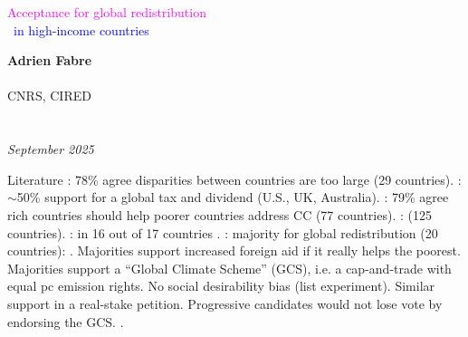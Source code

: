 \documentclass[aspectratio=169,xcolor=dvipsnames, 11pt,mathserif]{beamer}
\begin{document}

\begin{frame}
\thispagestyle{empty}
\begin{center}
\begin{LARGE}
\textcolor{magenta}{Acceptance for global redistribution}\\~\textcolor{blue}{in high-income countries} \end{LARGE}
\vspace{1cm}

\textbf{Adrien Fabre} \\ \quad \\
CNRS, CIRED \\ \quad \\ \quad \\
\textit{September 2025} 
\end{center}
\bigskip
\end{frame}


\begin{frame}{Literature\label{literature}}
\bbvsp
\ip {}: 78\% agree disparities between countries are too large (29 countries).
\ip {}: $\sim$50\% support for a global tax and dividend (U.S., UK, Australia).
\ip {}: 79\% agree rich countries should help poorer countries address CC (77 countries).
\ip {}:  (125 countries).
\ip {}:  in 16 out of 17 countries .
\ip {}:  majority  for global redistribution (20 countries):
\bbvsp \ip {}.
\ip Majorities support increased foreign aid if it really helps the poorest.
\ip Majorities support a ``Global Climate Scheme'' (GCS), i.e. a cap-and-trade with equal pc emission rights.
\ip No social desirability bias (list experiment). Similar support in a real-stake petition.
\ip Progressive candidates would not lose vote by endorsing the GCS.
\ip {}.
\ee \ee
\end{frame}
\end{document}

